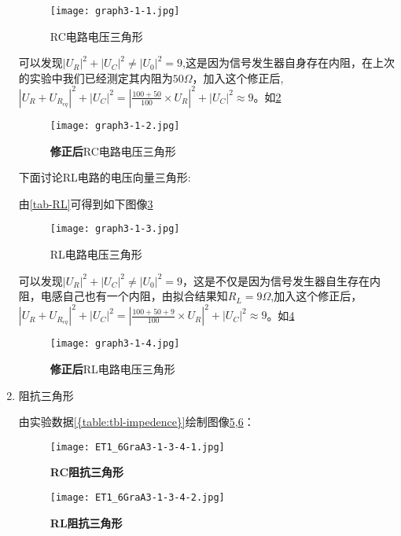 \documentclass[dvipsnames, svgnames,a4paper,11pt]{article}
\begin{document}
\begin{enumerate}
			\begin{figure}[htbp]
				\centering
				\texttt{[image: graph3-1-1.jpg]}
				\caption{RC电路电压三角形}
				\label{fig:graph3-1-1}
			\end{figure}

			可以发现$|U_R|^2+|U_C|^2\neq |U_0|^2= 9$,这是因为信号发生器自身存在内阻，在上次的实验中我们已经测定其内阻为$50\Omega$，加入这个修正后,$|U_R+U_{R_{eq}}|^2+|U_C|^2= |\frac{100+50}{100}\times U_R|^2+|U_C|^2\approx9$。如\cref{fig:graph3-1-2}

			\begin{figure}[htbp]
				\centering
				\texttt{[image: graph3-1-2.jpg]}
				\caption{\textbf{修正后}RC电路电压三角形}
				\label{fig:graph3-1-2}
			\end{figure}

			下面讨论RL电路的电压向量三角形:

			由\cref{tab-RL}可得到如下图像\cref{fig:graph3-1-3}

			\begin{figure}[htbp]
				\centering
				\texttt{[image: graph3-1-3.jpg]}
				\caption{RL电路电压三角形}
				\label{fig:graph3-1-3}
			\end{figure}

			可以发现$|U_R|^2+|U_C|^2\neq |U_0|^2= 9$，这是不仅是因为信号发生器自生存在内阻，电感自己也有一个内阻，由拟合结果知$R_L=9\Omega$,加入这个修正后，$|U_R+U_{R_{eq}}|^2+|U_C|^2= |\frac{100+50+9}{100}\times U_R|^2+|U_C|^2\approx9$。如\cref{fig:graph3-1-4}

			\begin{figure}[htbp]
				\centering
				\texttt{[image: graph3-1-4.jpg]}
				\caption{\textbf{修正后}RL电路电压三角形}
				\label{fig:graph3-1-4}
			\end{figure}
			
		\item 阻抗三角形

			由实验数据\cref{{table:tbl-impedence}}绘制图像\cref{fig:ET1_6GraA3-1-3-4-1},\cref{fig:ET1_6GraA3-1-3-4-2}：

			\begin{figure}[htbp]
				\centering
				\texttt{[image: ET1\_6GraA3-1-3-4-1.jpg]}
				\caption{\textbf{RC阻抗三角形}}
				\label{fig:ET1_6GraA3-1-3-4-1}
			\end{figure}

			\begin{figure}[htbp]
				\centering
				\texttt{[image: ET1\_6GraA3-1-3-4-2.jpg]}
				\caption{\textbf{RL阻抗三角形}}
				\label{fig:ET1_6GraA3-1-3-4-2}
			\end{figure} 
			

\end{enumerate}
\end{document}
